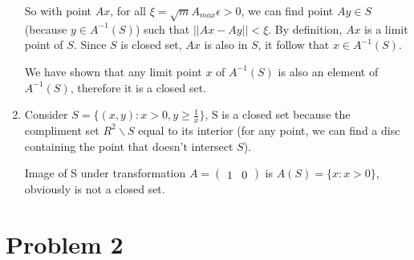 \documentclass[12pt,letterpaper]{article}
\begin{document}
\begin{alphalist}
\begin{enumerate}[label=(\roman*)]
        So with point $Ax$, for all $\xi = \sqrt{m}A_{max}\epsilon>0$, we can find
        point $Ay \in S$ (because $y \in A^{-1}(S)$) such that $|| Ax - Ay || < \xi$. By definition, $Ax$
        is a limit point of $S$. Since $S$ is closed set, $Ax$ is also in $S$,
        it follow that $x \in A^{-1}(S)$.

        We have shown that any limit point $x$ of $A^{-1}(S)$ is also an
        element of $A^{-1}(S)$, therefore it is a closed set.

    \item Consider $S = \{(x, y) : x > 0, y \ge \frac{1}{x}\}$, S is a closed
        set because the compliment set $R^2 \backslash S$ equal to its interior (for any
        point, we can find a disc containing the point that doesn't intersect
        $S$).

        Image of S under transformation $A = (\begin{smallmatrix} 1 & 0
        \end{smallmatrix})$ is $A(S) = \{ x : x > 0 \}$, obviously is not a
        closed set.

\end{enumerate} %

\end{alphalist}

%
%
%
%     
%    
%     
%


\section*{Problem 2}
\end{document}
